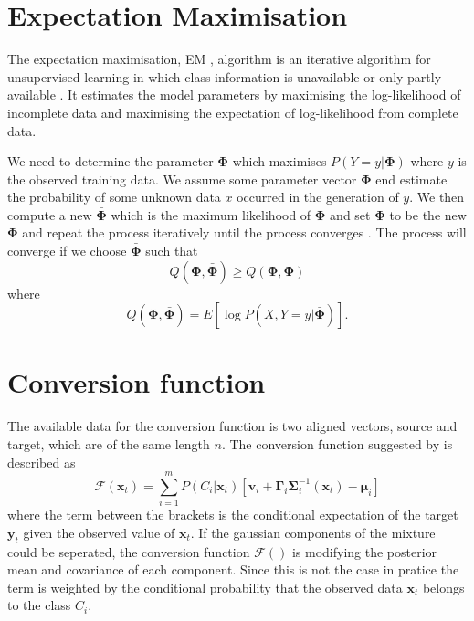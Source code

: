 \section{Expectation Maximisation} %
\label{sec:expectation_maximisation}
The expectation maximisation, EM , algorithm is an iterative algorithm for unsupervised learning in which class information is unavailable or only partly available \cite{taletek}. It estimates the model parameters by maximising the log-likelihood of incomplete data and maximising the expectation of log-likelihood from complete data.

We need to determine the parameter $\mathbf{\Phi}$ which maximises $P(Y=y\vert \mathbf{\Phi})$ where $y$ is the observed training data. We assume some parameter vector $\mathbf{\Phi}$ end estimate the probability of some unknown data $x$ occurred in the generation of $y$. We then compute a new $\bar{\mathbf{\Phi}}$ which is the maximum likelihood of $\mathbf{\Phi}$ and set $\mathbf{\Phi}$ to be the new $\bar{\mathbf{\Phi}}$ and repeat the process iteratively until the process converges \cite{taletek}. The process will converge if we choose $\bar{\mathbf{\Phi}}$ such that 
\begin{equation}
	Q(\mathbf{\Phi},\bar{\mathbf{\Phi}})\geq Q(\mathbf{\Phi},\mathbf{\Phi})
\end{equation}
where 
\begin{equation}
	Q(\mathbf{\Phi},\bar{\mathbf{\Phi}}) = E[\log P(X,Y=y\vert \bar{\mathbf{\Phi}})].
\end{equation}


\section{Conversion function} %
\label{sec:conversion_function}
The available data for the conversion function is two aligned vectors, source and target, which are of the same length $n$. The conversion function suggested by \cite{stylianou95} is described as
\begin{equation}
	\label{eq:conversion_function}
	\mathcal{F}(\mathbf{x}_t) = \sum_{i=1}^{m}P(C_i \vert \mathbf{x}_t)[\mathbf{v}_i + \boldsymbol{\Gamma}_i \mathbf{\Sigma}_i^{-1}(\mathbf{x}_t)-\boldsymbol{\mu}_i]
\end{equation}
where the term between the brackets is the conditional expectation of the target $\mathbf{y}_t$ given the observed value of $\mathbf{x}_t$. If the gaussian components of the mixture could be seperated, the conversion function $\mathcal{F}()$ is modifying the posterior mean and covariance of each component. Since this is not the case in pratice the term is weighted by the conditional probability that the observed data $\mathbf{x}_t$ belongs to the class $C_i$.

